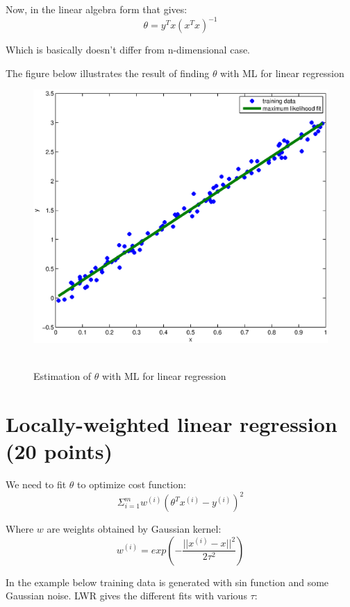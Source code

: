 \documentclass{article}
\begin{document}
\begin{enumerate}
		Now, in the linear algebra form that gives:
		$$\theta = y^T x (x^T x)^{-1} $$
		
		Which is basically doesn't differ from n-dimensional case.
		
		The figure below illustrates the result of finding $\theta$ with ML for linear regression
		
		\begin{figure}[!htb]
			\centering
			\includegraphics[width=6in,clip,keepaspectratio]{MLE.eps}\
			\caption{Estimation of $\theta$ with ML for linear regression}	
		\end{figure}
		
	\end{enumerate}
	
\section{Locally-weighted linear regression (20 points)}
	We need to fit $\theta$ to optimize cost function:	
	$$\Sigma_{i=1}^{m} w^{(i)} (\theta^T x^{(i)} - y^{(i)})^2$$
	
	Where $w$ are weights obtained by Gaussian kernel:
	$$w^{(i)} = exp(- \frac{||x^{(i)} - x||^2}{2\tau^2})$$
	
	In the example below training data is generated with sin function and some Gaussian noise. LWR gives the different fits with various $\tau$:
	
\end{document}
